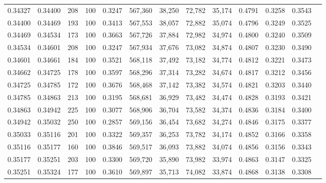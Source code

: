\begin{tabular}{rrrrrrrrrrrrr}
0.34327 & 0.34400 &   208 & 100 &                                     0.3247 & 567,360 &  38,250 &  72,782 &  35,174 & 0.4791 & 0.3258 & 0.3543 \\
0.34400 & 0.34469 &   193 & 100 &                                     0.3413 & 567,553 &  38,057 &  72,882 &  35,074 & 0.4796 & 0.3249 & 0.3525 \\
0.34469 & 0.34534 &   173 & 100 &                                     0.3663 & 567,726 &  37,884 &  72,982 &  34,974 & 0.4800 & 0.3240 & 0.3509 \\
0.34534 & 0.34601 &   208 & 100 &                                     0.3247 & 567,934 &  37,676 &  73,082 &  34,874 & 0.4807 & 0.3230 & 0.3490 \\
0.34601 & 0.34661 &   184 & 100 &                                     0.3521 & 568,118 &  37,492 &  73,182 &  34,774 & 0.4812 & 0.3221 & 0.3473 \\
0.34662 & 0.34725 &   178 & 100 &                                     0.3597 & 568,296 &  37,314 &  73,282 &  34,674 & 0.4817 & 0.3212 & 0.3456 \\
0.34725 & 0.34785 &   172 & 100 &                                     0.3676 & 568,468 &  37,142 &  73,382 &  34,574 & 0.4821 & 0.3203 & 0.3440 \\
0.34785 & 0.34863 &   213 & 100 &                                     0.3195 & 568,681 &  36,929 &  73,482 &  34,474 & 0.4828 & 0.3193 & 0.3421 \\
0.34863 & 0.34942 &   225 & 100 &                                     0.3077 & 568,906 &  36,704 &  73,582 &  34,374 & 0.4836 & 0.3184 & 0.3400 \\
0.34942 & 0.35032 &   250 & 100 &                                     0.2857 & 569,156 &  36,454 &  73,682 &  34,274 & 0.4846 & 0.3175 & 0.3377 \\
0.35033 & 0.35116 &   201 & 100 &                                     0.3322 & 569,357 &  36,253 &  73,782 &  34,174 & 0.4852 & 0.3166 & 0.3358 \\
0.35116 & 0.35177 &   160 & 100 &                                     0.3846 & 569,517 &  36,093 &  73,882 &  34,074 & 0.4856 & 0.3156 & 0.3343 \\
0.35177 & 0.35251 &   203 & 100 &                                     0.3300 & 569,720 &  35,890 &  73,982 &  33,974 & 0.4863 & 0.3147 & 0.3325 \\
0.35251 & 0.35324 &   177 & 100 &                                     0.3610 & 569,897 &  35,713 &  74,082 &  33,874 & 0.4868 & 0.3138 & 0.3308 \\

\end{tabular}

